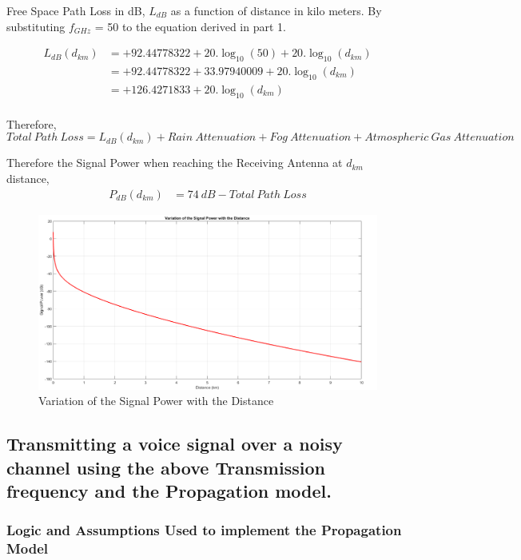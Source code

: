 \documentclass[a4paper,11pt]{article}%
\begin{document}
Free Space Path Loss in dB, $L_{dB}$ as a function of distance in kilo meters. By substituting $f_{GHz}$ = 50 to the equation derived in part 1.

\[
\begin{split}
L_{dB}(d_{km})&= +92.44778322+20.\log_{10}(50) + 20.\log_{10}(d_{km})\\
&=+92.44778322+ 33.97940009 + 20.\log_{10}(d_{km})\\
&=+126.4271833+ 20.\log_{10}(d_{km})\\
\end{split}
\]

Therefore, \[Total~Path~Loss = L_{dB}(d_{km}) + Rain~Attenuation+Fog~Attenuation+Atmospheric~Gas~Attenuation \]

Therefore the Signal Power when reaching the Receiving Antenna at $d_{km}$ distance,
\[
\begin{split}
P_{dB}(d_{km}) & =74~dB - Total~Path~Loss
\end{split}
\]

\begin{figure}[!h]
	\centering
	\includegraphics[scale=0.35]{figures/sp}
	\caption{Variation of the Signal Power with the Distance}
\end{figure}
\pagebreak

\subsection{Transmitting a voice signal over a noisy channel using the above Transmission frequency and the Propagation model.}
\vspace{5mm}
\subsubsection{Logic and Assumptions Used to implement the Propagation Model}
\end{document}
